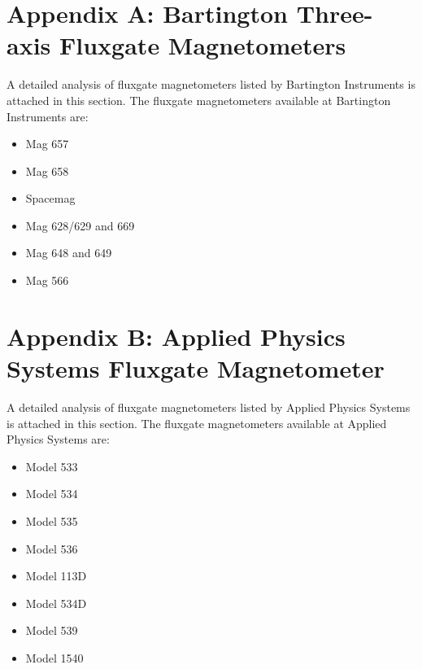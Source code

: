 \documentclass[a4paper,10pt]{report}
\begin{document}
\newpage
\appendix
 \section*{Appendix A: Bartington Three-axis Fluxgate Magnetometers}
A detailed analysis of fluxgate magnetometers listed by Bartington Instruments is
attached in this section. The fluxgate magnetometers available at Bartington
Instruments are:
\begin{itemize}
 \item Mag 657
 \item Mag 658
 \item Spacemag
 \item Mag 628/629 and 669
 \item Mag 648 and 649
 \item Mag 566
\end{itemize}

 
 
 


 
\section*{Appendix B: Applied Physics Systems Fluxgate Magnetometer}
A detailed analysis of fluxgate magnetometers listed by Applied Physics Systems is
attached in this section. The fluxgate magnetometers available at Applied Physics
Systems are:
\begin{itemize}
 \item Model 533
 \item Model 534
 \item Model 535
 \item Model 536
 \item Model 113D
 \item Model 534D
 \item Model 539
 \item Model 1540
\end{itemize}

 
 
 
 
 
 
 
 
\end{document}
